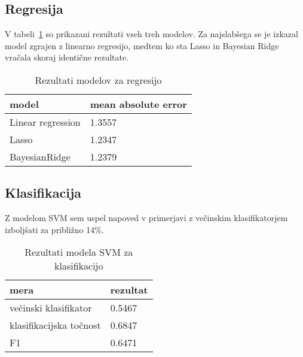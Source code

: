\documentclass[a4paper,11pt]{article}
\begin{document}
\subsection{Regresija}
V tabeli~\ref{tab1} so prikazani rezultati vseh treh modelov. Za najslabšega se je
izkazal model zgrajen z linearno regresijo, medtem ko sta Lasso in Bayesian Ridge
vračala skoraj identične rezultate.


\begin{table}[htbp]
\caption{Rezultati modelov za regresijo}
\label{tab1}
\begin{center}
\begin{tabular}{lp{4cm}}
\hline
model & mean absolute error \\
\hline
Linear regression & 1.3557 \\
Lasso & 1.2347 \\
BayesianRidge & 1.2379 \\
\hline
\end{tabular}
\end{center}
\end{table}

\subsection{Klasifikacija}

Z modelom SVM sem uspel napoved v primerjavi z večinskim klasifikatorjem izboljšati
za približno 14\%.

\begin{table}[htbp]
\caption{Rezultati modela SVM za klasifikacijo}
\label{tab2}
\begin{center}
\begin{tabular}{lp{4cm}}
\hline
mera & rezultat \\
\hline
večinski klasifikator & 0.5467 \\
klasifikacijska točnost & 0.6847 \\
F1 & 0.6471 \\
\hline
\end{tabular}
\end{center}
\end{table}
\end{document}
